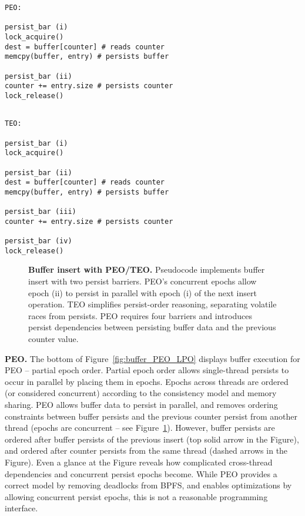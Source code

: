{
\singlespacing
\newsavebox{\BufferPEO}
\begin{lrbox}{\BufferPEO}
  \begin{lstlisting}
PEO:

persist_bar (i)
lock_acquire()
dest = buffer[counter] # reads counter
memcpy(buffer, entry) # persists buffer

persist_bar (ii)
counter += entry.size # persists counter
lock_release()
  \end{lstlisting}
\end{lrbox}

\newsavebox{\BufferTEO}
\begin{lrbox}{\BufferTEO}
  \begin{lstlisting}

TEO:

persist_bar (i)
lock_acquire()

persist_bar (ii)
dest = buffer[counter] # reads counter
memcpy(buffer, entry) # persists buffer

persist_bar (iii)
counter += entry.size # persists counter

persist_bar (iv)
lock_release()
  \end{lstlisting}
\end{lrbox}

\begin{figure}[]
\centering
\subfigure{ \usebox{\BufferPEO} }
\vspace{1 in}
\subfigure{ \usebox{\BufferTEO} }
\caption{\textbf{Buffer insert with PEO/TEO.} Pseudocode implements buffer insert with two persist barriers.  PEO's concurrent epochs allow epoch (ii) to persist in parallel with epoch (i) of the next insert operation. TEO simplifies persist-order reasoning, separating volatile races from persists.  PEO requires four barriers and introduces persist dependencies between persisting buffer data and the previous counter value.}
\label{fig:buffer_PEO_pseudocode}
\end{figure}
}

\textbf{PEO.} The bottom of Figure~\ref{fig:buffer_PEO_LPO} displays buffer execution for PEO -- partial epoch order.
Partial epoch order allows single-thread persists to occur in parallel by placing them in epochs.
Epochs across threads are ordered (or considered concurrent) according to the consistency model and memory sharing.
PEO allows buffer data to persist in parallel, and removes ordering constraints between buffer persists and the previous counter persist from another thread (epochs are concurrent -- see Figure~\ref{fig:buffer_PEO_pseudocode}).
However, buffer persists are ordered after buffer persists of the previous insert (top solid arrow in the Figure), and ordered after counter persists from the same thread (dashed arrows in the Figure).
Even a glance at the Figure reveals how complicated cross-thread dependencies and concurrent persist epochs become.
While PEO provides a correct model by removing deadlocks from BPFS, and enables optimizations by allowing concurrent persist epochs, this is not a reasonable programming interface.

